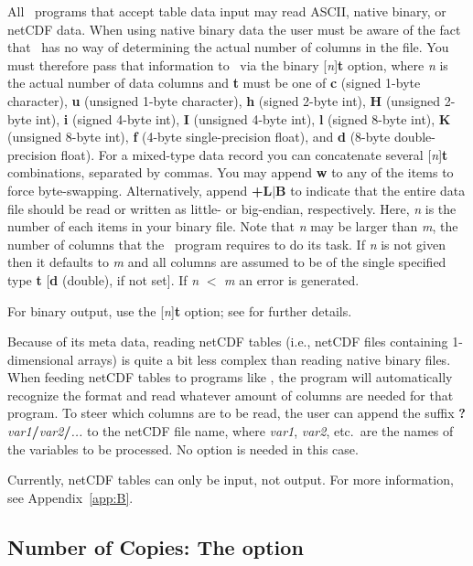All \GMT\ programs that accept table data input may read ASCII, native binary, or netCDF data.
When using native binary data the user must be aware
of the fact that \GMT\ has no way of determining the actual
number of columns in the file.  You must therefore pass that
information to \GMT\ via the binary [\emph{n}]\textbf{t} option,
where \emph{n} is the actual number of data columns and \textbf{t}
must be one of \textbf{c} (signed 1-byte character), \textbf{u}
(unsigned 1-byte character), \textbf{h} (signed 2-byte int), \textbf{H}
(unsigned 2-byte int), \textbf{i} (signed 4-byte int), \textbf{I}
(unsigned 4-byte int), \textbf{l} (signed 8-byte int), \textbf{K}
(unsigned 8-byte int), \textbf{f} (4-byte single-precision float), and
\textbf{d} (8-byte double-precision float).  For a mixed-type data record
you can concatenate several [\emph{n}]\textbf{t} combinations,
separated by commas.  You may append \textbf{w}
to any of the items to force byte-swapping.  Alternatively, append
\textbf{+L}$|$\textbf{B} to indicate that the entire data file
should be read or written as little- or big-endian, respectively.
Here, \emph{n} is the number of each items in your binary file.
Note that \emph{n} may be larger than \emph{m}, the number of
columns that the \GMT\ program requires to do its task.
If \emph{n} is not given then it defaults to \emph{m} and all columns
are assumed to be of the single specified type \textbf{t} [\textbf{d} (double), if not set].
If \emph{n} $<$ \emph{m} an error is generated.

For binary output, use the [\emph{n}]\textbf{t} option; see  for further
details.

Because of its meta data, reading netCDF tables (i.e., netCDF files containing 1-dimensional arrays)
is quite a bit less complex than reading native binary files. When feeding netCDF tables to programs
like , the program will automatically recognize the format and read whatever amount of
columns are needed for that program. To steer which columns are to be read, the user can
append the suffix \textbf{?}\emph{var1}\textbf{/}\emph{var2}\textbf{/}\emph{...} to the netCDF file name,
where \emph{var1}, \emph{var2}, etc.\
are the names of the variables to be processed. No  option is needed in this case.

Currently, netCDF tables can only be input, not output.
For more information, see Appendix~\ref{app:B}.

\subsection{Number of Copies: The  option}

